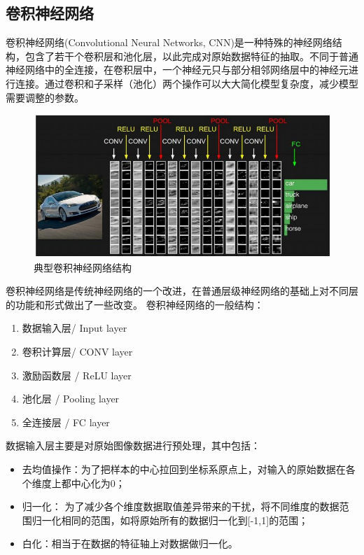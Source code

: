 \subsection{卷积神经网络}

卷积神经网络(Convolutional Neural Networks, CNN)是一种特殊的神经网络结构，包含了若干个卷积层和池化层，以此完成对原始数据特征的抽取。不同于普通神经网络中的全连接，在卷积层中，一个神经元只与部分相邻网络层中的神经元进行连接。通过卷积和子采样（池化）两个操作可以大大简化模型复杂度，减少模型需要调整的参数。
\begin{figure}[h]
  \centering
  \includegraphics[scale=0.5]{static/cnn.jpg}
  \caption{典型卷积神经网络结构\cite{CNN2017}}
\end{figure}
卷积神经网络是传统神经网络的一个改进，在普通层级神经网络的基础上对不同层的功能和形式做出了一些改变。
卷积神经网络的一般结构：
\begin{enumerate}
  \item 数据输入层/ Input layer
  \item 卷积计算层/ CONV layer
  \item 激励函数层 / ReLU layer
  \item 池化层 / Pooling layer
  \item 全连接层 / FC layer
\end{enumerate}


数据输入层主要是对原始图像数据进行预处理，其中包括：
\begin{itemize}
  \item 去均值操作：为了把样本的中心拉回到坐标系原点上，对输入的原始数据在各个维度上都中心化为0；
  \item 归一化： 为了减少各个维度数据取值差异带来的干扰，将不同维度的数据范围归一化相同的范围，如将原始所有的数据归一化到[-1,1]的范围；
  \item 白化：相当于在数据的特征轴上对数据做归一化。
\end{itemize}

